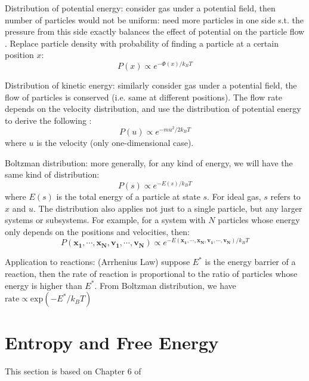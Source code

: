 \documentclass{report}
\begin{document}
\begin{enumerate}
Distribution of potential energy: consider gas under a potential field, then number of particles would not be uniform: need more particles in one side s.t. the pressure from this side exactly balances the effect of potential on the particle flow \cite{Feynman63}. Replace particle density with probability of finding a particle at a certain position $x$: 
\begin{equation}
P(x) \propto e^{-\Phi(x) / k_B T}
\end{equation}

Distribution of kinetic energy: similarly consider gas under a potential field, the flow of particles is conserved (i.e. same at different positions). The flow rate depends on the velocity distribution, and use the distribution of potential energy to derive the following \cite{Feynman63}: 
\begin{equation}
P(u) \propto e^{-m u^2 / 2 k_B T}
\end{equation}
where $u$ is the velocity (only one-dimensional case). 

Boltzman distribution: more generally, for any kind of energy, we will have the same kind of distribution: 
\begin{equation}
P(s) \propto e^{-E(s) / k_B T}
\end{equation}
where $E(s)$ is the total energy of a particle at state $s$. For ideal gas, $s$ refers to $x$ and $u$. The distribution also applies not just to a single particle, but any larger systems or subsystems. For example, for a system with $N$ particles whose energy only depends on the positions and velocities, then: 
\begin{equation}
P(\mathbf{x_1}, \cdots, \mathbf{x_N}, \mathbf{v_1}, \cdots, \mathbf{v_N}) \propto e^{-E(\mathbf{x_1}, \cdots, \mathbf{x_N}, \mathbf{v_1}, \cdots, \mathbf{v_N}) / k_B T}
\end{equation}

Application to reactions: (Arrhenius Law) suppose $E^{*}$ is the energy barrier of a reaction, then the rate of reaction is proportional to the ratio of particles whose energy is higher than $E^{*}$. From Boltzman distribution, we have $ \textrm{rate} \propto \textrm{exp}(-E^{*}/k_B T)$ 

\end{enumerate}
\section{Entropy and Free Energy}
This section is based on Chapter 6 of \cite{Nelson04}
\end{document}
